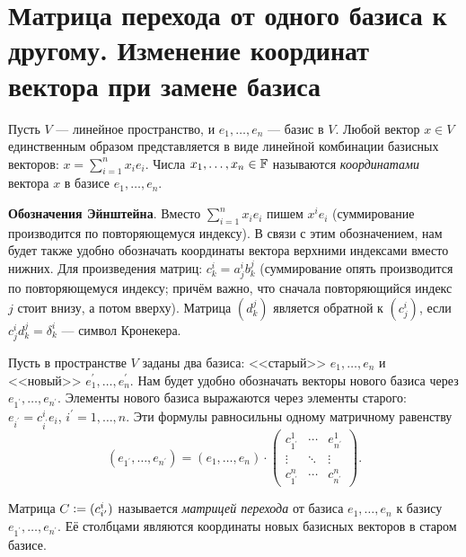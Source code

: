 \section{Матрица перехода от одного базиса к другому. Изменение координат вектора при замене базиса}

\begin{definition}
    Пусть $V$ --- линейное пространство, и $e_1, \ldots, e_n$ --- базис в $V$. Любой вектор $x \in V$ единственным образом представляется в виде линейной комбинации базисных векторов: $x = \sum\limits_{i = 1}^nx_ie_i$. Числа $x_1, \ldots, x_n \in \mathbb{F}$ называются \textit{координатами} вектора $x$ в базисе $e_1, \ldots, e_n$.
\end{definition}

\textbf{Обозначения Эйнштейна}. Вместо $\sum\limits_{i = 1}^nx_ie_i$ пишем $x^ie_i$ (суммирование производится по повторяющемуся индексу). В связи с этим обозначением, нам будет также удобно обозначать координаты вектора верхними индексами вместо нижних. Для произведения матриц: $c^i_k = a^i_jb^j_k$ (суммирование опять производится по повторяющемуся индексу; причём важно, что сначала повторяющийся индекс $j$ стоит внизу, а потом вверху). Матрица $(d^j_k)$ является обратной к $(c^i_j)$, если $c^i_jd^j_k = \delta^i_k$ --- символ Кронекера.

Пусть в пространстве $V$ заданы два базиса: <<старый>> $e_1, \ldots, e_n$ и <<новый>> $e^\prime_1, \ldots, e^\prime_n$. Нам будет удобно обозначать векторы нового базиса через $e_{1^\prime}, \ldots, e_{n^\prime}$. Элементы нового базиса выражаются через элементы старого: $e_{i^\prime} = c^i_{i^\prime}e_i$, $i^\prime = 1, \ldots, n$. Эти формулы равносильны одному матричному равенству
\[
    (e_{1^\prime}, \ldots, e_{n^\prime}) = (e_1, \ldots, e_n) \cdot
    \begin{pmatrix}
        c^1_{1^\prime} & \cdots & e^1_{n^\prime}\\
        \vdots & \ddots & \vdots\\
        c^n_{1^\prime} & \cdots & c^n_{n^\prime}
    \end{pmatrix}.
\]

\begin{definition}
    Матрица $C \vcentcolon = (c^i_{i^\prime})$ называется \textit{матрицей перехода} от базиса $e_1, \ldots, e_n$ к базису $e_{1^\prime}, \ldots, e_{n^\prime}$. Её столбцами являются координаты новых базисных векторов в старом базисе.
\end{definition}


